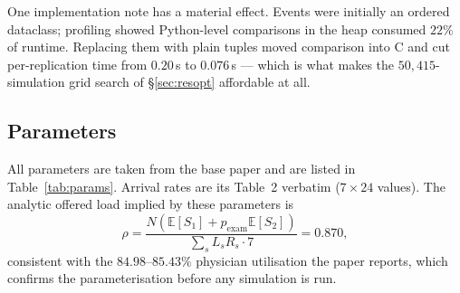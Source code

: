\documentclass[sigconf,nonacm]{acmart}
\begin{document}
One implementation note has a material effect. Events were initially an ordered
dataclass; profiling showed Python-level comparisons in the heap consumed $22\%$
of runtime. Replacing them with plain tuples moved comparison into C and cut
per-replication time from $0.20$\,s to $0.076$\,s --- which is what makes the
$50{,}415$-simulation grid search of \S\ref{sec:resopt} affordable at all.

\subsection{Parameters}
All parameters are taken from the base paper and are listed in
Table~\ref{tab:params}. Arrival rates are its Table~2 verbatim ($7\times24$
values). The analytic offered load implied by these parameters is
\begin{equation}
\rho = \frac{N\left(\mathbb{E}[S_1] + p_{\text{exam}}\mathbb{E}[S_2]\right)}
            {\sum_{s} L_s R_s \cdot 7} = 0.870 ,
\end{equation}
consistent with the $84.98$--$85.43\%$ physician utilisation the paper reports,
which confirms the parameterisation before any simulation is run.
\end{document}
